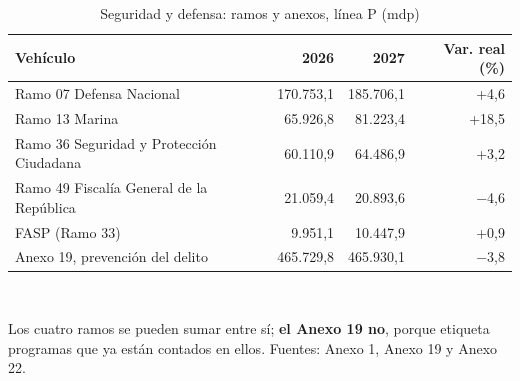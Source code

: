 \begin{table}[htbp]\centering\small
\caption{Seguridad y defensa: ramos y anexos, línea P (mdp)}\label{cua:seg}
\begin{tabular}{lrrr}
\toprule
Vehículo & 2026 & 2027 & Var. real (\%) \\
\midrule
Ramo 07 Defensa Nacional & 170.753,1 & 185.706,1 & +4,6 \\
Ramo 13 Marina & 65.926,8 & 81.223,4 & +18,5 \\
Ramo 36 Seguridad y Protección Ciudadana & 60.110,9 & 64.486,9 & +3,2 \\
Ramo 49 Fiscalía General de la República & 21.059,4 & 20.893,6 & $-$4,6 \\
FASP (Ramo 33) & 9.951,1 & 10.447,9 & +0,9 \\
Anexo 19, prevención del delito & 465.729,8 & 465.930,1 & $-$3,8 \\
\bottomrule
\end{tabular}
\\[2pt]\begin{minipage}{0.92\textwidth}\scriptsize Los cuatro ramos se pueden sumar entre sí; \textbf{el Anexo 19 no}, porque etiqueta programas que ya están contados en ellos. Fuentes: Anexo 1, Anexo 19 y Anexo 22.\end{minipage}
\end{table}
